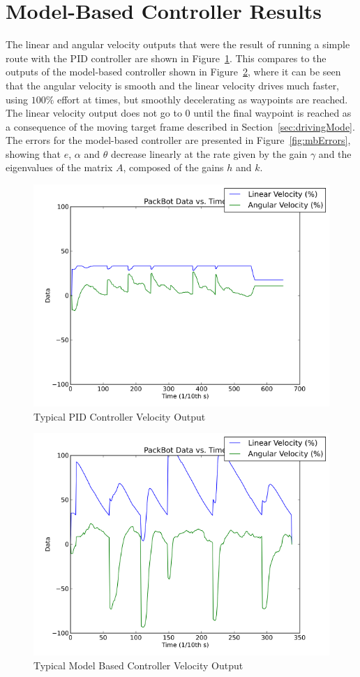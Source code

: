 \section{Model-Based Controller Results}%
\label{sec:lyapunovResults}
The linear and angular velocity outputs that were the result of running a simple route with the PID controller are shown in Figure~\ref{fig:pidOutput}.
This compares to the outputs of the model-based controller shown in Figure~\ref{fig:mbOutput}, where it can be seen that the angular velocity is smooth and the linear velocity drives much faster, using $100\%$ effort at times, but smoothly decelerating as waypoints are reached.
The linear velocity output does not go to $0$ until the final waypoint is reached as a consequence of the moving target frame described in Section~\ref{sec:drivingMode}.
The errors for the model-based controller are presented in Figure~\ref{fig:mbErrors}, showing that $e$, $\alpha$ and $\theta$ decrease linearly at the rate given by the gain $\gamma$ and the eigenvalues of the matrix $A$, composed of the gains $h$ and $k$.

\begin{figure}[ht!]
\centering
\includegraphics[width=.5\textwidth]{images/pbtx/20110109_1815_pbtx_simpleDrivePID}
\caption{Typical PID Controller Velocity Output}%
\label{fig:pidOutput}
\end{figure}

\begin{figure}[ht!]
\centering
\includegraphics[width=.5\textwidth]{images/pbtx/20110113_1451_pbtx_simpleDrive}
\caption{Typical Model Based Controller Velocity Output}%
\label{fig:mbOutput}
\end{figure}


